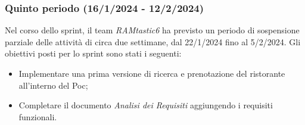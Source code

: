 \subsubsection{Quinto periodo (16/1/2024 - 12/2/2024)}
Nel corso dello sprint, il team \emph{RAMtastic6} ha previsto un periodo di sospensione parziale delle attività di circa due settimane, dal 22/1/2024 fino al 5/2/2024.
Gli obiettivi posti per lo sprint sono stati i seguenti:
\begin{itemize}
    \item Implementare una prima versione di ricerca e prenotazione del ristorante all'interno del Poc;
    \item Completare il documento \emph{Analisi dei Requisiti} aggiungendo i requisiti funzionali.
\end{itemize}

